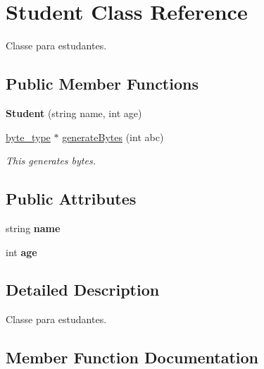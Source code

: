 \hypertarget{class_student}{}\section{Student Class Reference}
\label{class_student}


Classe para estudantes.  


\subsection*{Public Member Functions}
\begin{DoxyCompactItemize}
\item 
\mbox{\label{class_student_acf416180ef3a658162d5563acc371304}} 
{\bfseries Student} (string name, int age)
\item 
\mbox{\hyperlink{mytest_8cpp_a714864ff21f0676254badf81106b3339}{byte\+\_\+type}} $\ast$ \mbox{\hyperlink{class_student_adf39ab602e4f2f93a1166e129ea03ba1}{generate\+Bytes}} (int abc)
\begin{DoxyCompactList}\small\item\em This generates bytes. \end{DoxyCompactList}\end{DoxyCompactItemize}
\subsection*{Public Attributes}
\begin{DoxyCompactItemize}
\item 
\mbox{\label{class_student_a671f6b115a158653a0f0bece34ea0667}} 
string {\bfseries name}
\item 
\mbox{\label{class_student_a552a431a43ffc545d180424597d51f97}} 
int {\bfseries age}
\end{DoxyCompactItemize}


\subsection{Detailed Description}
Classe para estudantes. 



\subsection{Member Function Documentation}
\mbox{\label{class_student_adf39ab602e4f2f93a1166e129ea03ba1}} 
